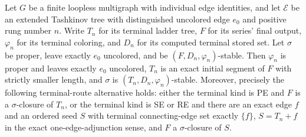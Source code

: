 \begin{lemma}
Let $G$ be a finite loopless multigraph with individual edge identities,
and let $\mathcal E$ be an extended Tashkinov tree with distinguished
uncolored edge $e_0$ and positive rung number $n$. Write $T_n$ for its
terminal ladder tree, $F$ for its series' final output, $\varphi_n$ for
its terminal coloring, and $D_n$ for its computed terminal stored set.
Let $\sigma$ be proper, leave exactly $e_0$ uncolored, and be
$(F,D_n,\varphi_n)$-stable. Then $\varphi_n$ is proper and leaves exactly
$e_0$ uncolored, $T_n$ is an exact initial segment of $F$ with strictly
smaller length, and $\sigma$ is $(T_n,D_n,\varphi_n)$-stable.
Moreover, precisely the following terminal-route alternative holds:
either the terminal kind is PE and $F$ is a $\sigma$-closure of $T_n$,
or the terminal kind is SE or RE and there are an exact edge $f$ and
an ordered seed $S$ with terminal connecting-edge set exactly $\{f\}$,
$S=T_n+f$ in the exact one-edge-adjunction sense, and $F$ a
$\sigma$-closure of $S$.
\end{lemma}
